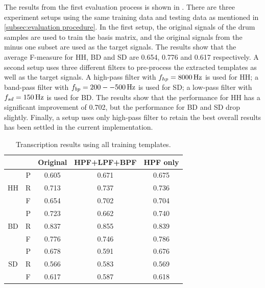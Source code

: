 \documentclass{article}
\begin{document}
The results from the first evaluation process is shown in . There are three experiment setups using the same training data and testing data as mentioned in \ref{subsec:evaluation procedure}. In the first setup, the original signals of the drum samples are used to train the basis matrix, and the original signals from the minus one subset are used as the target signals. The results show that the average F-measure for HH, BD and SD are 0.654, 0.776 and 0.617 respectively. A second setup uses three different filters to pre-process the extracted templates as well as the target signals. A high-pass filter with $f_{hp} = \unit[8000]{Hz}$ is used for HH; a band-pass filter with $f_{bp} = \unit[200--500]{Hz}$ is used for SD; a low-pass filter with $f_{sd} = \unit[150]{Hz}$ is used for BD. The results show that the performance for HH has a significant improvement of 0.702, but the performance for BD and SD drop slightly. Finally, a setup uses only high-pass filter to retain the best overall results has been settled in the current implementation. 

\begin{table}[h]
\begin{center}
\begin{tabular}{|c|c|c|c|c|}
\hline
\multicolumn{2}{|c|}{}  & Original & HPF+LPF+BPF & HPF only \\ \hline
\multirow{3}{*}{HH} & P & 0.605    & 0.671       & 0.675    \\ \cline{2-5} 
                    & R & 0.713    & 0.737       & 0.736    \\ \cline{2-5} 
                    & F & 0.654    & 0.702       & 0.704    \\ \hline
\multirow{3}{*}{BD} & P & 0.723    & 0.662       & 0.740    \\ \cline{2-5} 
                    & R & 0.837    & 0.855       & 0.839    \\ \cline{2-5} 
                    & F & 0.776    & 0.746       & 0.786    \\ \hline
\multirow{3}{*}{SD} & P & 0.678    & 0.591       & 0.676    \\ \cline{2-5} 
                    & R & 0.566    & 0.583       & 0.569    \\ \cline{2-5} 
                    & F & 0.617    & 0.587       & 0.618    \\ \hline
\end{tabular}
\end{center}
 \caption{Transcription results using all training templates.}
 \label{tab:basicResults}
\end{table}
\end{document}
